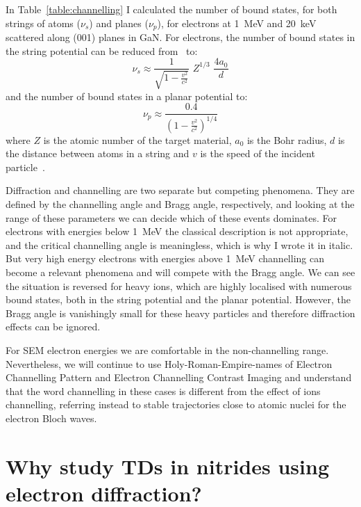 In Table~\ref{table:channelling} I calculated the number of bound states, for both strings of atoms ($\nu_s$) and planes ($\nu_p$), for electrons at \SI{1}{\mega \electronvolt} and \SI{20}{\kilo \electronvolt} scattered along \hkl(001) planes in GaN. For electrons, the number of bound states in the string potential can be reduced from~\cite{Lindhard65} to:
\begin{equation*}
\nu_s \approx \frac{1}{\sqrt{1-\frac{v^2}{c^2}}}\,\, Z^{1/3} \,\, \frac{4a_0}{d}
\end{equation*}
and the number of bound states in a planar potential to:
\begin{equation*}
\nu_p \approx \frac{0.4}{(1-\frac{v^2}{c^2})^{1/4}} 
\end{equation*}
where $Z$ is the atomic number of the target material, $a_0$ is the Bohr radius, $d$ is the distance between atoms in a string and $v$ is the speed of the incident particle~\cite{Uggerhoj69}.  

Diffraction and channelling are two separate but competing phenomena. They are defined by the channelling angle and Bragg angle, respectively, and looking at the range of these parameters we can decide which of these events dominates. For electrons with energies below \SI{1}{\mega \electronvolt} the classical description is not appropriate, and the critical channelling angle is meaningless, which is why I wrote it in italic. But very high energy electrons with energies above \SI{1}{\mega \electronvolt} channelling can become a relevant phenomena and will compete with the Bragg angle. We can see the situation is reversed for heavy ions, which are highly localised with numerous bound states, both in the string potential and the planar potential. However, the Bragg angle is vanishingly small for these heavy particles and therefore diffraction effects can be ignored. 

For SEM electron energies we are comfortable in the non-channelling range. Nevertheless, we will continue to use Holy-Roman-Empire-names of Electron Channelling Pattern and Electron Channelling Contrast Imaging and understand that the word channelling in these cases is different from the effect of ions channelling, referring instead to stable trajectories close to atomic nuclei for the electron Bloch waves. 






\section{Why study TDs in nitrides using electron diffraction?}


